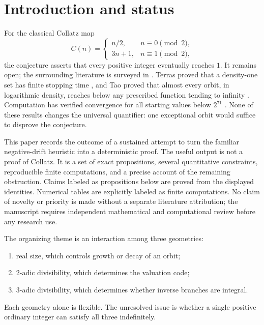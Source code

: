 \documentclass[11pt,reqno]{amsart}
\theoremstyle{plain}
\theoremstyle{definition}
\numberwithin{equation}{section}
\begin{document}
\maketitle

\tableofcontents

\section{Introduction and status}
\label{sec:intro}

For the classical Collatz map
\[
C(n)=
\begin{cases}
n/2,&n\equiv0\pmod 2,\\
3n+1,&n\equiv1\pmod 2,
\end{cases}
\]
the conjecture asserts that every positive integer eventually reaches $1$.
It remains open; the surrounding literature is surveyed in
\cite{lagarias1985}.  Terras proved that a density-one set has finite stopping
time \cite{terras1976}, and Tao proved that almost every orbit, in logarithmic
density, reaches below any prescribed function tending to infinity
\cite{tao2022}.  Computation has verified convergence for all starting values
below $2^{71}$ \cite{barina2025}.  None of these results changes the universal
quantifier: one exceptional orbit would suffice to disprove the conjecture.

This paper records the outcome of a sustained attempt to turn the familiar
negative-drift heuristic into a deterministic proof.  The useful output is not
a proof of Collatz.  It is a set of exact propositions, several quantitative
constraints, reproducible finite computations, and a precise account of the
remaining obstruction.  Claims labeled as propositions below are proved from
the displayed identities.  Numerical tables are explicitly labeled as finite
computations.  No claim of novelty or priority is made without a separate
literature attribution; the manuscript requires independent mathematical and
computational review before any research use.

The organizing theme is an interaction among three geometries:
\begin{enumerate}
  \item real size, which controls growth or decay of an orbit;
  \item $2$-adic divisibility, which determines the valuation code;
  \item $3$-adic divisibility, which determines whether inverse branches are
        integral.
\end{enumerate}
Each geometry alone is flexible.  The unresolved issue is whether a single
positive ordinary integer can satisfy all three indefinitely.
\end{document}
